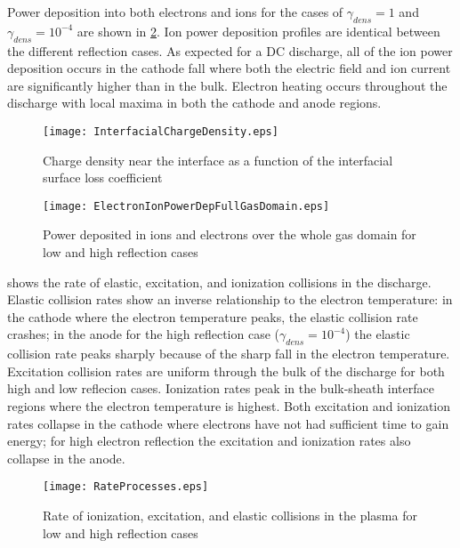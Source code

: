 Power deposition into both electrons and ions for the cases of $\gamma_{dens}=1$ and $\gamma_{dens}=10^{-4}$ are shown in \cref{fig:powerDep_em_Arp_full}. Ion power deposition profiles are identical between the different reflection cases. As expected for a DC discharge, all of the ion power deposition occurs in the cathode fall where both the electric field and ion current are significantly higher than in the bulk. Electron heating occurs throughout the discharge with local maxima in both the cathode and anode regions.

\begin{figure}[htpb]
  \centering
  \texttt{[image: InterfacialChargeDensity.eps]}
  \caption{Charge density near the interface as a function of the interfacial surface loss coefficient}
  \label{fig:charge_dens_int}
\end{figure}

\begin{figure}[htpb]
  \centering
  \texttt{[image: ElectronIonPowerDepFullGasDomain.eps]}
  \caption{Power deposited in ions and electrons over the whole gas domain for low and high reflection cases}
  \label{fig:powerDep_em_Arp_full}
\end{figure}

 shows the rate of elastic, excitation, and ionization collisions in the discharge. Elastic collision rates show an inverse relationship to the electron temperature: in the cathode where the electron temperature peaks, the elastic collision rate crashes; in the anode for the high reflection case ($\gamma_{dens}=10^{-4}$) the elastic collision rate peaks sharply because of the sharp fall in the electron temperature. Excitation collision rates are uniform through the bulk of the discharge for both high and low reflecion cases. Ionization rates peak in the bulk-sheath interface regions where the electron temperature is highest. Both excitation and ionization rates collapse in the cathode where electrons have not had sufficient time to gain energy; for high electron reflection the excitation and ionization rates also collapse in the anode.

\begin{figure}[htpb]
  \centering
  \texttt{[image: RateProcesses.eps]}
  \caption{Rate of ionization, excitation, and elastic collisions in the plasma for low and high reflection cases}
  \label{fig:rateProc}
\end{figure}


